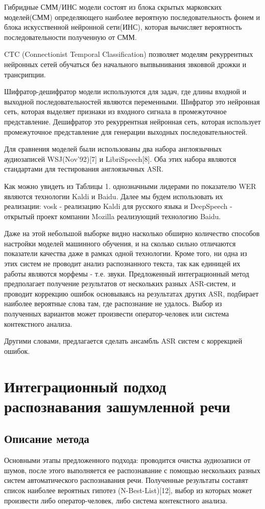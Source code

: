 \documentclass[conference]{IEEEtran}
\begin{document}
Гибридные СММ/ИНС модели состоят из блока скрытых марковских моделей(СММ) определяющего наиболее вероятную последовательность фонем
и блока искусственной нейронной сети(ИНС), которая вычисляет вероятность последовательности полученную от СММ.

CTC (Connectionist Temporal Classification) позволяет моделям рекуррентных нейронных сетей обучаться без начального выпвынивания звковвой дрожки и трансрипции.

Шифратор-дешифратор модели используются для задач, где длины входной и выходной последовательностей являются переменными.
Шифратор это нейронная сеть, которая выделяет признаки из входного сигнала в промежуточное представление.
Дешифратор это рекуррентная нейронная сеть, которая использует  промежуточное представление для генерации выходных последовательностей.

Для сравнения моделей были использованы два набора англоязычных аудиозаписей WSJ(Nov’92)[7] и LibriSpeech[8].
Оба этих набора являются стандартами для тестирования англоязычных ASR.

Как можно увидеть из Таблицы 1. однозначными лидерами по показателю WER являются технологии Kaldi и Baidu. Далее мы будем использовать их реализации: vosk - реализацию Kaldi для русского языка и DeepSpeech - открытый проект компании Mozilla реализующий технологию Baidu.

Даже на этой небольшой выборке видно насколько обширно количество способов настройки моделей машинного обучения, и на сколько сильно отличаются показатели качества даже в рамках одной технологии. Кроме того, ни одна из этих систем не проводит анализ распознанного текста, так как единицей их работы являются морфемы - т.е. звуки. Предложенный интеграционный метод предполагает получение результатов от нескольких разных ASR-систем, и проводит коррекцию ошибок основываясь на результатах других ASR, подбирает наиболее вероятные слова там, где распознание не удалось. Выбор из полученных вариантов может произвести оператор-человек или система контекстного анализа.

Другими словами, предлагается сделать ансамбль ASR систем с коррекцией ошибок.

\section{Интеграционный подход распознавания зашумленной речи}
\subsection{Описание метода}
Основными этапы предложенного подхода: проводится очистка аудиозаписи от шумов, после этого выполняется ее распознавание с помощью нескольких разных систем автоматического распознавания речи. Полученные результаты составят список наиболее вероятных гипотез (N-Best-List)[12], выбор из которых может произвести либо оператор-человек, либо система контекстного анализа.
\end{document}

